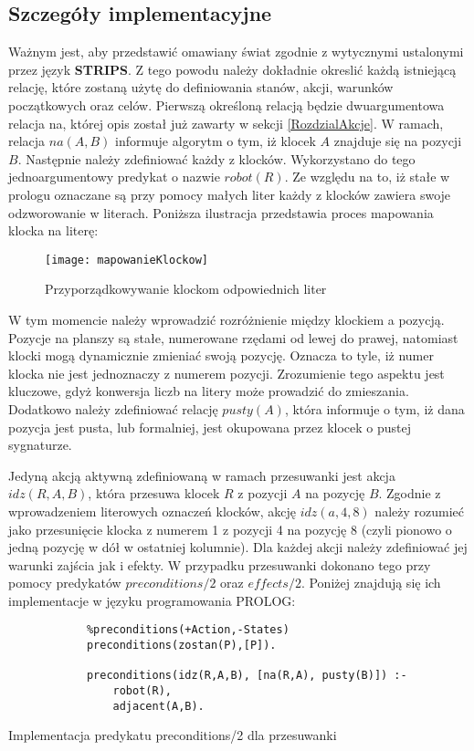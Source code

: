     \subsection{Szczegóły implementacyjne}
    Ważnym jest, aby przedstawić omawiany świat zgodnie z wytycznymi ustalonymi przez język \textbf{STRIPS}. Z tego powodu należy dokładnie okreslić 
    każdą istniejącą relację, które zostaną użytę do definiowania stanów, akcji, warunków początkowych oraz celów. 
    Pierwszą określoną relacją będzie dwuargumentowa relacja na, której opis został już zawarty w sekcji \ref{RozdzialAkcje}. W ramach,
    relacja $na(A,B)$ informuje algorytm o tym, iż klocek $A$ znajduje się na pozycji $B$. Następnie należy zdefiniować każdy z klocków. 
    Wykorzystano do tego jednoargumentowy predykat o nazwie $robot(R)$. Ze względu na to, iż stałe w prologu oznaczane są przy pomocy 
    małych liter każdy z klocków zawiera swoje odzworowanie w literach. Poniższa ilustracja przedstawia proces mapowania klocka na literę:

    \begin{figure}[H]
        \texttt{[image: mapowanieKlockow]}
        \centering
        \caption{Przyporządkowywanie klockom odpowiednich liter}
    \end{figure}

    W tym momencie należy wprowadzić rozróżnienie między klockiem a pozycją. Pozycje na planszy są stałe, numerowane rzędami od lewej do prawej,
    natomiast klocki mogą dynamicznie zmieniać swoją pozycję. Oznacza to tyle, iż numer klocka nie jest jednoznaczy z numerem pozycji. 
    Zrozumienie tego aspektu jest kluczowe, gdyż konwersja liczb na litery może prowadzić do zmieszania. 
    Dodatkowo należy zdefiniować relację $pusty(A)$, która informuje o tym, iż dana pozycja jest pusta, lub formalniej, jest okupowana 
    przez klocek o pustej sygnaturze. 

    Jedyną akcją aktywną zdefiniowaną w ramach przesuwanki jest akcja $idz(R,A,B)$, która przesuwa klocek $R$ z pozycji $A$ na pozycję $B$.
    Zgodnie z wprowadzeniem literowych oznaczeń klocków, akcję $idz(a,4,8)$ należy rozumieć jako przesunięcie klocka z numerem 1 z pozycji 4 
    na pozycję 8 (czyli pionowo o jedną pozycję w dół w ostatniej kolumnie). Dla każdej akcji należy zdefiniować jej warunki zajścia jak i efekty.
    W przypadku przesuwanki dokonano tego przy pomocy predykatów $preconditions/2$ oraz $effects/2$. Poniżej znajdują się ich implementacje 
    w języku programowania PROLOG:
    \begin{listing}[H]
        \begin{verbatim}
            %preconditions(+Action,-States)
            preconditions(zostan(P),[P]).

            preconditions(idz(R,A,B), [na(R,A), pusty(B)]) :-
                robot(R), 
                adjacent(A,B).
        \end{verbatim}
    \caption{Implementacja predykatu preconditions/2 dla przesuwanki}
    \end{listing}

